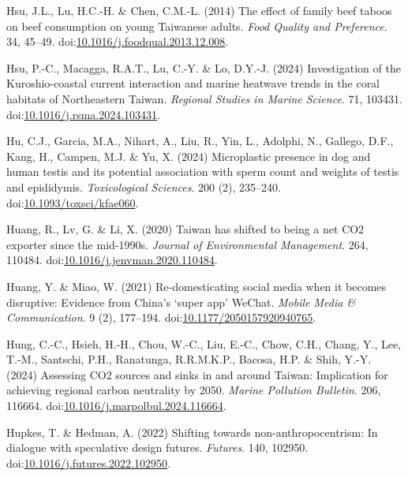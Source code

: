 \documentclass[
  letterpaper,
  DIV=11,
  numbers=noendperiod]{scrartcl}
\newlength{\cslhangindent}
\newenvironment{CSLReferences}[2] %
 {\begin{list}{}{%
  \setlength{\itemindent}{0pt}
  \setlength{\leftmargin}{0pt}
  \setlength{\parsep}{0pt}
  \ifodd #1
   \setlength{\leftmargin}{\cslhangindent}
   \setlength{\itemindent}{-1\cslhangindent}
  \fi
  \setlength{\itemsep}{#2\baselineskip}}}
 {\end{list}}
\begin{document}
\begin{CSLReferences}{0}{1}
Hsu, J.L., Lu, H.C.-H. \& Chen, C.M.-L. (2014) The effect of family beef
taboos on beef consumption on young {Taiwanese} adults. \emph{Food
Quality and Preference}. 34, 45--49.
doi:\href{https://doi.org/10.1016/j.foodqual.2013.12.008}{10.1016/j.foodqual.2013.12.008}.

Hsu, P.-C., Macagga, R.A.T., Lu, C.-Y. \& Lo, D.Y.-J. (2024)
Investigation of the {Kuroshio-coastal} current interaction and marine
heatwave trends in the coral habitats of {Northeastern Taiwan}.
\emph{Regional Studies in Marine Science}. 71, 103431.
doi:\href{https://doi.org/10.1016/j.rsma.2024.103431}{10.1016/j.rsma.2024.103431}.

Hu, C.J., Garcia, M.A., Nihart, A., Liu, R., Yin, L., Adolphi, N.,
Gallego, D.F., Kang, H., Campen, M.J. \& Yu, X. (2024) Microplastic
presence in dog and human testis and its potential association with
sperm count and weights of testis and epididymis. \emph{Toxicological
Sciences}. 200 (2), 235--240.
doi:\href{https://doi.org/10.1093/toxsci/kfae060}{10.1093/toxsci/kfae060}.

Huang, R., Lv, G. \& Li, X. (2020) Taiwan has shifted to being a net
{CO2} exporter since the mid-1990s. \emph{Journal of Environmental
Management}. 264, 110484.
doi:\href{https://doi.org/10.1016/j.jenvman.2020.110484}{10.1016/j.jenvman.2020.110484}.

Huang, Y. \& Miao, W. (2021) Re-domesticating social media when it
becomes disruptive: {Evidence} from {China}'s {`super app'} {WeChat}.
\emph{Mobile Media \& Communication}. 9 (2), 177--194.
doi:\href{https://doi.org/10.1177/2050157920940765}{10.1177/2050157920940765}.

Hung, C.-C., Hsieh, H.-H., Chou, W.-C., Liu, E.-C., Chow, C.H., Chang,
Y., Lee, T.-M., Santschi, P.H., Ranatunga, R.R.M.K.P., Bacosa, H.P. \&
Shih, Y.-Y. (2024) Assessing {CO2} sources and sinks in and around
{Taiwan}: {Implication} for achieving regional carbon neutrality by
2050. \emph{Marine Pollution Bulletin}. 206, 116664.
doi:\href{https://doi.org/10.1016/j.marpolbul.2024.116664}{10.1016/j.marpolbul.2024.116664}.

Hupkes, T. \& Hedman, A. (2022) Shifting towards non-anthropocentrism:
{In} dialogue with speculative design futures. \emph{Futures}. 140,
102950.
doi:\href{https://doi.org/10.1016/j.futures.2022.102950}{10.1016/j.futures.2022.102950}.


\end{CSLReferences}
\end{document}
